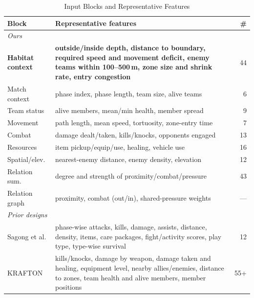 \documentclass[conference]{IEEEtran}
\begin{document}
\begin{table}[t]
\centering
\caption{Input Blocks and Representative Features}
\label{tab:blocks}
\footnotesize
\setlength{\tabcolsep}{3pt}
\begin{tabular}{p{1.75cm}p{5.6cm}r}
\hline
Block & Representative features & \# \\
\hline
\multicolumn{3}{l}{\emph{Ours}} \\
\textbf{Habitat context} & \textbf{outside/inside depth, distance to boundary, required speed and movement deficit, enemy teams within 100--500\,m, zone size and shrink rate, entry congestion} & 44 \\
Match context & phase index, phase length, team size, alive teams & 6 \\
Team status & alive members, mean/min health, member spread & 9 \\
Movement & path length, mean speed, tortuosity, zone-entry time & 7 \\
Combat & damage dealt/taken, kills/knocks, opponents engaged & 13 \\
Resources & item pickup/equip/use, healing, vehicle use & 16 \\
Spatial/elev. & nearest-enemy distance, enemy density, elevation & 12 \\
Relation sum. & degree and strength of proximity/combat/pressure & 43 \\
Relation graph & proximity, combat (out/in), shared-pressure weights & --- \\
\hline
\multicolumn{3}{l}{\emph{Prior designs}} \\
Sagong et al. & phase-wise attacks, kills, damage, assists, distance, density, items, care packages, fight/activity scores, play type, type-wise survival & 12 \\
KRAFTON & kills/knocks, damage by weapon, damage taken and healing, equipment level, nearby allies/enemies, distance to zones, team health and alive members, member positions & 55+ \\
\hline
\end{tabular}
\end{table}
\end{document}
